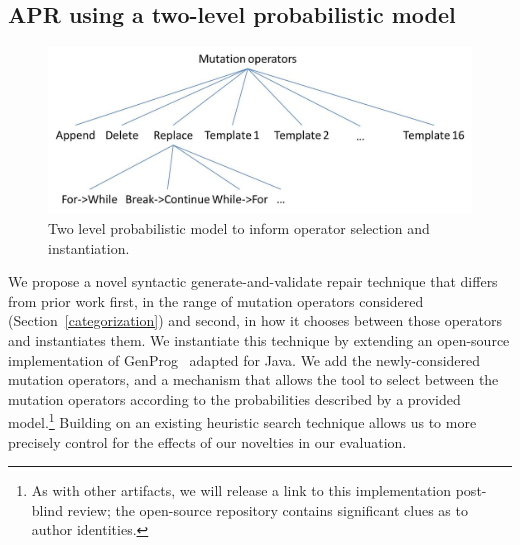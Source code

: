 \documentclass[conference]{IEEEtran}
\begin{document}



\subsection{APR using a two-level probabilistic model}

\begin{figure}[!h]
 \centering
    \includegraphics[width=\columnwidth]{Picture2}
  \caption{Two level probabilistic model to inform operator selection and instantiation. \label{fig:probModel}}
\end{figure}

We propose a novel syntactic generate-and-validate repair
technique that differs
from prior work first, in the range of mutation operators considered
(Section~\ref{categorization}) and second, in how it chooses between those
operators and instantiates them.  
We instantiate this technique by extending an open-source implementation of
GenProg~\cite{legoues12} adapted for Java.  We add the newly-considered mutation
operators, and a mechanism that allows the tool to
select between the mutation operators according to the probabilities described by
a provided model.\footnote{As with other artifacts, we will release a link to
  this implementation post-blind review; the open-source repository contains
  significant clues as to author identities.}
Building on an existing heuristic search technique allows us to more precisely
control for the effects of our novelties in our evaluation.  
\end{document}
